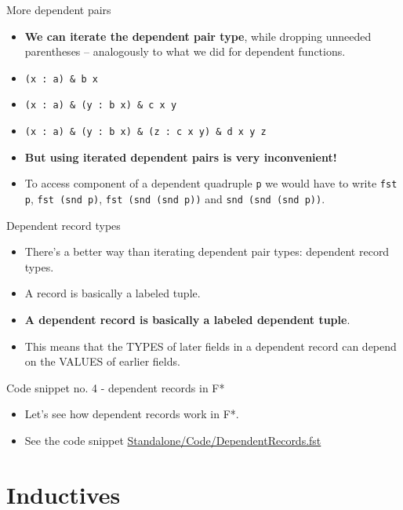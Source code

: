 \documentclass{beamer}
\newcommand{\m}[1]{\texttt{#1}}
\begin{document}
\begin{frame}{More dependent pairs}
\begin{itemize}
	\item \textbf{We can iterate the dependent pair type}, while dropping unneeded parentheses -- analogously to what we did for dependent functions.
	\item \m{(x :\ a) \& b x}
	\item \m{(x :\ a) \& (y :\ b x) \& c x y}
	\item \m{(x :\ a) \& (y :\ b x) \& (z :\ c x y) \& d x y z}
	\item \textbf{But using iterated dependent pairs is very inconvenient!}
	\item To access component of a dependent quadruple \m{p} we would have to write \m{fst p}, \m{fst (snd p)}, \m{fst (snd (snd p))} and \m{snd (snd (snd p))}.
\end{itemize}
\end{frame}

\begin{frame}{Dependent record types}
\begin{itemize}
	\item There's a better way than iterating dependent pair types: dependent record types.
	\item A record is basically a labeled tuple.
	\item \textbf{A dependent record is basically a labeled dependent tuple}.
	\item This means that the TYPES of later fields in a dependent record can depend on the VALUES of earlier fields.
\end{itemize}
\end{frame}

\begin{frame}{Code snippet no. 4 - dependent records in F*}
\begin{itemize}
	\item Let's see how dependent records work in F*.
	\item See the code snippet \href{https://github.com/wkolowski/Dependent-Types-and-Theorem-Proving/blob/master/Standalone/Code/DependentRecords.fst}{Standalone/Code/DependentRecords.fst}
\end{itemize}
\end{frame}

\section{Inductives}
\end{document}
